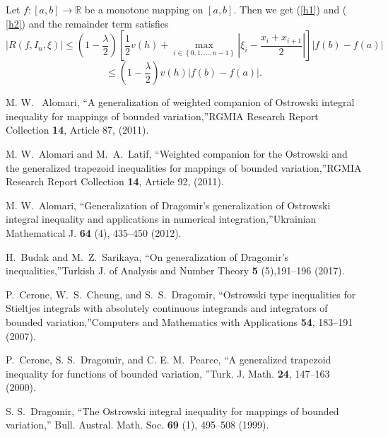\documentclass[
11pt,%
tightenlines,%
twoside,%
onecolumn,%
nofloats,%
nobibnotes,%
nofootinbib,%
superscriptaddress,%
noshowpacs,%
centertags]%
{revtex4}
\begin{document}
\begin{corollary}
Let $f:\left[ a,b\right] \rightarrow
\mathbb{R}
$ be a monotone mapping on $\left[ a,b\right] .$ Then we get (\ref{h1}) and (%
\ref{h2}) and the remainder term satisfies%
$$
\left\vert R(f,I_{n},\xi )\right\vert \leq \left( 1-\frac{\lambda }{2}%
\right) \left[ \frac{1}{2}v(h)+\max_{i\in \left\{ 0,1,...,n-1\right\}
}\left\vert \xi _{i}-\frac{x_{i}+x_{i+1}}{2}\right\vert \right] \left\vert
f(b)-f(a)\right\vert
$$
$$
\leq \left( 1-\frac{\lambda }{2}\right) v(h)\left\vert
f(b)-f(a)\right\vert.
$$
\end{corollary}

\begin{thebibliography}{20}
%

 M. W. ~Alomari, \textquotedblleft A generalization of weighted
companion of Ostrowski integral inequality for mappings of bounded variation,\textquotedblright  RGMIA Research Report Collection \textbf{ 14}, Article 87, (2011).

  M. W.~Alomari and M.~A.~Latif, \textquotedblleft Weighted companion
for the Ostrowski and the generalized trapezoid inequalities for mappings of
bounded variation,\textquotedblright RGMIA Research Report Collection \textbf{14}, Article 92,
(2011).

 M. W.~Alomari, \textquotedblleft Generalization of Dragomir's
generalization of Ostrowski integral inequality and applications in
numerical integration,\textquotedblright Ukrainian Mathematical J. \textbf{64} (4), 435--450 (2012).

 H.~Budak and M.~Z.~Sarikaya, \textquotedblleft On generalization of
Dragomir's inequalities,\textquotedblright Turkish J. of Analysis
and Number Theory \textbf{5} (5),191--196 (2017).

 P.~Cerone, W.~S.~Cheung, and S.~S.~Dragomir, \textquotedblleft Ostrowski type inequalities for Stieltjes integrals with absolutely continuous integrands and integrators of bounded variation,\textquotedblright Computers and
Mathematics with Applications \textbf{54}, 183--191 (2007).

 P.~Cerone, S. S.~Dragomir, and C. E. M.~Pearce, \textquotedblleft A
generalized trapezoid inequality for functions of bounded variation,
\textquotedblright Turk. J. Math. \textbf{24}, 147--163 (2000).

 S. S.~Dragomir, \textquotedblleft The Ostrowski integral
inequality for mappings of bounded variation,\textquotedblright
Bull. Austral. Math.  Soc. \textbf{69} (1), 495--508 (1999).


\end{thebibliography}
\end{document}
